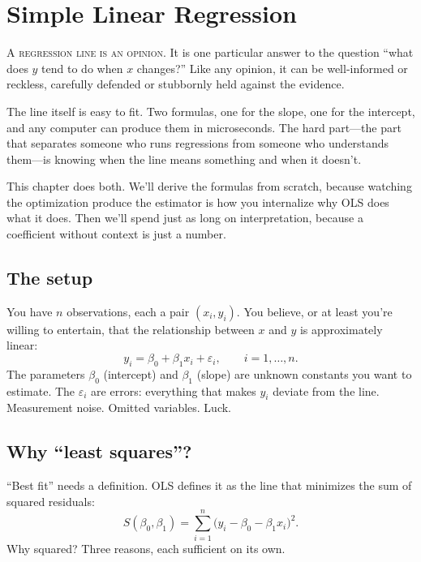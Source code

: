\chapter{Simple Linear Regression}
\label{ch:regression}

\noindent\textsc{A regression line is an opinion.} It is one particular answer to the question ``what does $y$ tend to do when $x$ changes?'' Like any opinion, it can be well-informed or reckless, carefully defended or stubbornly held against the evidence.

The line itself is easy to fit. Two formulas, one for the slope, one for the intercept, and any computer can produce them in microseconds. The hard part---the part that separates someone who runs regressions from someone who understands them---is knowing when the line means something and when it doesn't.

This chapter does both. We'll derive the formulas from scratch, because watching the optimization produce the estimator is how you internalize why OLS does what it does. Then we'll spend just as long on interpretation, because a coefficient without context is just a number.

\section{The setup}

You have $n$ observations, each a pair $(x_i, y_i)$. You believe, or at least you're willing to entertain, that the relationship between $x$ and $y$ is approximately linear:
\begin{equation}
  y_i = \beta_0 + \beta_1 x_i + \varepsilon_i, \qquad i = 1, \ldots, n.
  \label{eq:regression-model}
\end{equation}
The parameters $\beta_0$ (intercept) and $\beta_1$ (slope) are unknown constants you want to estimate. The $\varepsilon_i$ are errors: everything that makes $y_i$ deviate from the line. Measurement noise. Omitted variables. Luck.

\section{Why ``least squares''?}

``Best fit'' needs a definition. OLS defines it as the line that minimizes the sum of squared residuals:
\begin{equation}
  S(\beta_0, \beta_1) = \sum_{i=1}^{n} \bigl(y_i - \beta_0 - \beta_1 x_i\bigr)^2.
  \label{eq:sse}
\end{equation}
Why squared? Three reasons, each sufficient on its own.

